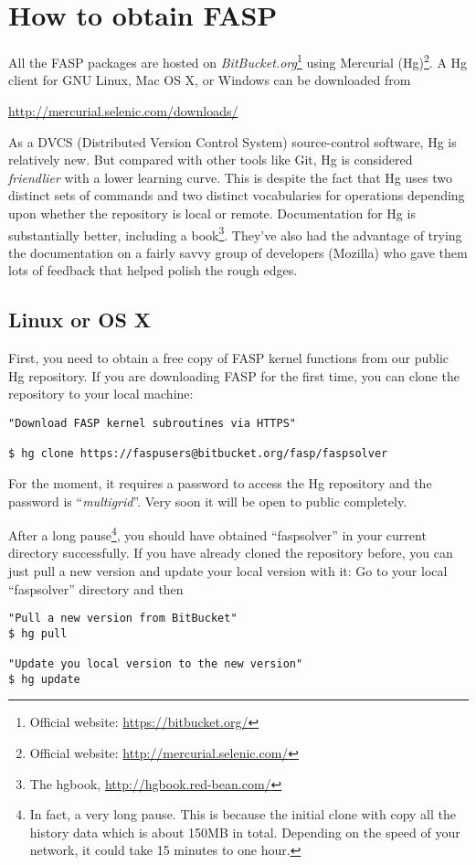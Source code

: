 \documentclass[11pt]{memoir}
\begin{document}
\section{How to obtain FASP}\label{sec:install}

All the FASP packages are hosted on \emph{BitBucket.org}\footnote{Official website: \url{https://bitbucket.org/}} using Mercurial (Hg)\footnote{Official website: \url{http://mercurial.selenic.com/}}. A Hg client for GNU Linux, Mac OS X, or Windows can be downloaded from 
\begin{center}
  \url{http://mercurial.selenic.com/downloads/} 
\end{center}


As a DVCS (Distributed Version Control System) source-control software, Hg is relatively new. But compared with other tools like Git, Hg is considered \emph{friendlier} with a lower learning curve. This is despite the fact that Hg uses two distinct sets of commands and two distinct vocabularies for operations depending upon whether the repository is local or remote.
Documentation for Hg is substantially better, including a book\footnote{The hgbook, \url{http://hgbook.red-bean.com/}}. They've also had the advantage of trying the documentation on a fairly savvy group of developers (Mozilla) who gave them lots of feedback that helped polish the rough edges.

\subsection{Linux or OS X}
First, you need to obtain a free copy of FASP kernel functions from our public Hg repository. If you are downloading FASP for the first time, you can clone the repository to your local machine:
%
\begin{lstlisting}[numbers=none]
"Download FASP kernel subroutines via HTTPS"

$ hg clone https://faspusers@bitbucket.org/fasp/faspsolver
\end{lstlisting}
%
\begin{snugshade}\noindent
For the moment, it requires a password to access the Hg repository and the password is ``\emph{multigrid}''. Very soon it will be open to public completely. 
\end{snugshade}

After a long pause\footnote{In fact, a very long pause. This is because the initial clone with copy all the history data which is about 150MB in total. Depending on the speed of your network, it could take 15 minutes to one hour.}, you should have obtained ``faspsolver'' in your current directory successfully. If you have already cloned the repository before, you can just pull a new version and update your local version with it: Go to your local ``faspsolver'' directory and then
%
\begin{lstlisting}[numbers=none]
"Pull a new version from BitBucket"
$ hg pull

"Update you local version to the new version"
$ hg update
\end{lstlisting}
%
\end{document}
